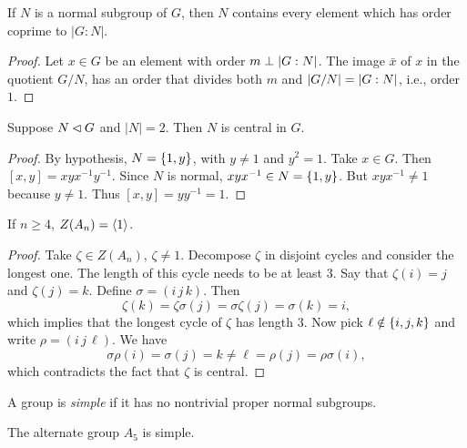 \begin{lem}\label{order-perp-index}
    If\/ $N$ is a normal subgroup of\/ $G$, then $N$ contains every element which has order coprime to $|G:N|$.
\end{lem}

\begin{proof} Let $x\in G$ be an element with order $m\perp\left\vert{G:N}\right\vert$. The image $\bar x$ of $x$ in the quotient $G/N$, has an order that divides both $m$ and $\left\vert{G/N}\right\vert=\left\vert{G:N}\right\vert$, i.e., order~$1$.  \end{proof}

\begin{lem}\label{normal-order2}
    Suppose $N\lhd G$ and $|N| = 2$. Then $N$ is central in $G$.
\end{lem}

\begin{proof} By hypothesis, $N=\{1,y\}$, with $y\ne1$ and $y^2=1$. Take $x\in G$. Then $[x,y]=xyx^{-1}y^{-1}$. Since $N$ is normal, $xyx^{-1}\in N=\{1,y\}$. But $xyx^{-1}\ne1$ because $y\ne1$. Thus $[x,y]=yy^{-1}=1$.  \end{proof}

\begin{lem}\label{Z(An)=1}
    If $n\ge4$, $Z(A_n)=\langle1\rangle$.
\end{lem}

\begin{proof} Take $\zeta\in Z(A_n)$, $\zeta\ne1$. Decompose $\zeta$ in disjoint cycles and consider the longest one. The length of this cycle needs to be at least $3$. Say that $\zeta(i)=j$ and $\zeta(j)=k$. Define $\sigma=(i\,j\,k)$. Then
$$
    \zeta(k)=\zeta\sigma(j)=\sigma\zeta(j)=\sigma(k)=i,
$$
which implies that the longest cycle of $\zeta$ has length $3$. Now pick $\ell\notin\{i,j,k\}$ and write $\rho=(i\,j\,\ell)$. We have
$$
    \sigma\rho(i)=\sigma(j) = k \ne \ell = \rho(j)=\rho\sigma(i),
$$
which contradicts the fact that $\zeta$ is central.  \end{proof}

\begin{defn}
    A group is \textsl{simple} if it has no nontrivial proper normal subgroups.
\end{defn}

\begin{prop}\label{A_5-is-simple}
    The alternate group $A_5$ is simple.
\end{prop}

